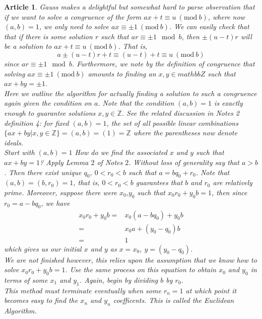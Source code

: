 \documentclass{article}
\theoremstyle{problemstyle}
\newtheorem{article}{Article}
\newcommand{\Mod}[1]{\ (\mathrm{mod}\ #1)}
\begin{document}
\begin{article}
Gauss makes a delightful but somewhat hard to parse observation that if we want to solve a congruence of the form $ax+t \equiv u \Mod{b}$, where now $(a,b) = 1$, we only need to solve $ax \equiv \pm 1 \Mod{b}$. We can easily check that that if there is some solution $r$ such that $ar \equiv \pm 1 \mod{b}$, then $\pm(u-t)r$ will be a solution to $ax+t \equiv u \Mod{b}$. That is, $$a\pm(u-t)r+t \equiv (u-t)+t \equiv u \Mod{b}$$ since $ar \equiv \pm 1 \mod{b}$. Furthermore, we note by the definition of congruence that solving  $ax \equiv \pm 1 \Mod{b}$ amounts to finding an $x,y \in mathbb{Z}$ such that $ax + by = \pm 1$.\\

Here we outline the algorithm for actually finding a solution to such a congruence again given the condition on $a$.  Note that the condition $(a,b) = 1$ is exactly enough to guarantee solutions $x,y \in \mathbb{Z}$. See the related discussion in Notes 2 definition 4: for fixed $(a,b) = 1$, the set of all possible linear combinations $\{ax+by|x,y \in \mathbb{Z}\} = (a,b) = (1) = \mathbb{Z}$ where the parentheses now denote ideals.\\ 

Start with $(a,b) = 1$ How do we find the associated $x$ and $y$ such that $ax+by = 1$? Apply Lemma $2$ of Notes $2$. Without loss of generality say that $a > b$. Then there exist unique $q_0$, $0< r_0 <b$ such that $a = bq_0 + r_0$. Note that $(a,b) = (b,r_0) = 1$, that is, $0< r_0 <b$ guarantees that $b$ and $r_0$ are relatively prime. Moreover, suppose there were $x_0$,$y_0$ such that $x_0r_0 + y_0b = 1$, then since $r_0 = a - bq_0$, we have  
\begin{align*}
x_0r_0 + y_0b =& x_0(a - bq_0) + y_0b \\
=& x_0a + (y_0 - q_0)b\\
=& 1
\end{align*}
which gives us our initial $x$ and $y$ as $x = x_0$, $y = (y_0 - q_0)$.\\

We are not finished however, this relies upon the assumption that we know how to solve $x_0r_0 + y_0b = 1$. Use the same process on this equation to obtain $x_0$ and $y_0$ in terms of some $x_1$ and $y_1$.  Again, begin by dividing $b$ by $r_0$.\\

This method must terminate eventually when some $r_n = 1$ at which point it becomes easy to find the $x_n$ and $y_n$ coefficents. This is called the Euclidean Algorithm. 
\end{article}
\end{document}
